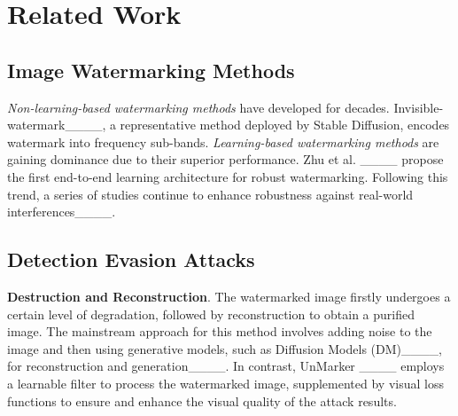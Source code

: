 \section{Related Work}
\subsection{Image Watermarking Methods}
\emph{Non-learning-based watermarking methods} have developed for decades. Invisible-watermark____, a representative method deployed by Stable Diffusion, encodes watermark into frequency sub-bands. \emph{Learning-based watermarking methods} are gaining dominance due to their superior performance. Zhu et al. ____ propose the first end-to-end learning architecture for robust watermarking. Following this trend, a series of studies continue to enhance robustness against real-world interferences____. 




\subsection{Detection Evasion Attacks}
\textbf{Destruction and Reconstruction}. The watermarked image firstly undergoes a certain level of degradation, followed by reconstruction to obtain a purified image. The mainstream approach for this method involves adding noise to the image and then using generative models, such as Diffusion Models (DM)____, for reconstruction and generation____. In contrast, UnMarker ____ employs a learnable filter to process the watermarked image, supplemented by visual loss functions to ensure and enhance the visual quality of the attack results. 

